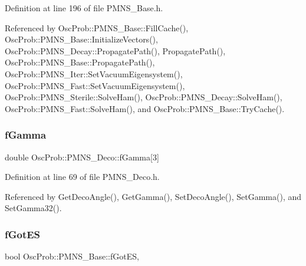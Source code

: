 Definition at line 196 of file P\+M\+N\+S\+\_\+\+Base.\+h.



Referenced by Osc\+Prob\+::\+P\+M\+N\+S\+\_\+\+Base\+::\+Fill\+Cache(), Osc\+Prob\+::\+P\+M\+N\+S\+\_\+\+Base\+::\+Initialize\+Vectors(), Osc\+Prob\+::\+P\+M\+N\+S\+\_\+\+Decay\+::\+Propagate\+Path(), Propagate\+Path(), Osc\+Prob\+::\+P\+M\+N\+S\+\_\+\+Base\+::\+Propagate\+Path(), Osc\+Prob\+::\+P\+M\+N\+S\+\_\+\+Iter\+::\+Set\+Vacuum\+Eigensystem(), Osc\+Prob\+::\+P\+M\+N\+S\+\_\+\+Fast\+::\+Set\+Vacuum\+Eigensystem(), Osc\+Prob\+::\+P\+M\+N\+S\+\_\+\+Sterile\+::\+Solve\+Ham(), Osc\+Prob\+::\+P\+M\+N\+S\+\_\+\+Decay\+::\+Solve\+Ham(), Osc\+Prob\+::\+P\+M\+N\+S\+\_\+\+Fast\+::\+Solve\+Ham(), and Osc\+Prob\+::\+P\+M\+N\+S\+\_\+\+Base\+::\+Try\+Cache().

\mbox{\label{classOscProb_1_1PMNS__Deco_ae2f30ac9f8b25344959f1698616d337a}} 
\subsubsection{\texorpdfstring{f\+Gamma}{fGamma}}
{\footnotesize\ttfamily double Osc\+Prob\+::\+P\+M\+N\+S\+\_\+\+Deco\+::f\+Gamma\mbox{[}3\mbox{]}\hspace{0.3cm}{\ttfamily [protected]}}



Definition at line 69 of file P\+M\+N\+S\+\_\+\+Deco.\+h.



Referenced by Get\+Deco\+Angle(), Get\+Gamma(), Set\+Deco\+Angle(), Set\+Gamma(), and Set\+Gamma32().

\mbox{\label{classOscProb_1_1PMNS__Base_a6dc5cd010d2d70b2324745b4e53e9839}} 
\subsubsection{\texorpdfstring{f\+Got\+ES}{fGotES}}
{\footnotesize\ttfamily bool Osc\+Prob\+::\+P\+M\+N\+S\+\_\+\+Base\+::f\+Got\+ES\hspace{0.3cm}{\ttfamily [protected]}, {\ttfamily [inherited]}}



